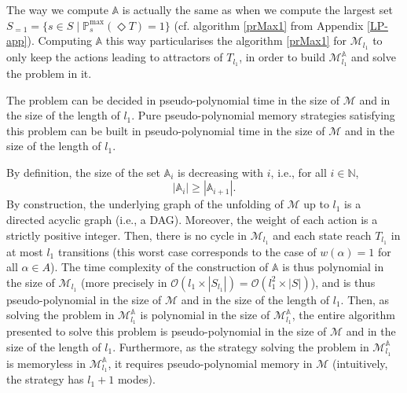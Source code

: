 The way we compute $\mathbb{A}$ is actually the same
as when we compute the largest set $S_{=1} = \{ s \in S \; | \; \mathbb{P}^{\max}_s(\Diamond T) = 1 \}$ (cf. algorithm \ref{prMax1} from Appendix \ref{LP-app}).
Computing $\mathbb{A}$ this way particularises the algorithm \ref{prMax1} for $\mathcal{M}_{l_1}$ to only keep the actions leading to attractors of $T_{l_1}$, in order to build $\mathcal{M}^\mathbb{A}_{l_1}$ and solve the \SSPE{} problem in it.

\begin{theorem}
  The \SSPWE{} problem can be decided in pseudo-polynomial time in the size of $\mathcal{M}$ and in the size of the length of $l_1$.
  Pure pseudo-polynomial memory strategies satisfying this problem can be built in pseudo-polynomial time in the size of $\mathcal{M}$ and in the size of the length of $l_1$.
\end{theorem}

By definition, the size of the set $\mathbb{A}_i$ is decreasing with $i$, i.e., for all $i \in \mathbb{N}$,
\[
  | \mathbb{A}_i | \geq | \mathbb{A}_{i+1} |.
\]
By construction, the underlying graph of the unfolding of $\mathcal{M}$ up to $l_1$ is a directed acyclic graph (i.e., a DAG). Moreover, the weight of each action is a strictly positive integer. Then, there is no cycle in $\mathcal{M}_{l_1}$ and each state reach $T_{l_1}$ in at most $l_1$ transitions (this worst case corresponds to the case of $w(\alpha)=1$ for all $\alpha \in A$).
The time complexity of the construction of $\mathbb{A}$ is thus polynomial in the size of $\mathcal{M}_{l_1}$ (more precisely in $\mathcal{O}(l_1 \times |S_{l_1}|) = \mathcal{O}(l_1^2 \times |S|)$), and is thus pseudo-polynomial in the size of $\mathcal{M}$ and in the size of the length of $l_1$. Then, as solving the \SSPE{} problem in $\mathcal{M}^\mathbb{A}_{l_1}$ is polynomial in the size of $\mathcal{M}^\mathbb{A}_{l_1}$,
the entire algorithm presented to solve this problem is pseudo-polynomial in the size of $\mathcal{M}$ and in the size of the length of $l_1$.
Furthermore, as the strategy solving the \SSPE{} problem in $\mathcal{M}_{l_1}^\mathbb{A}$ is memoryless in $\mathcal{M}_{l_1}^\mathbb{A}$, it requires pseudo-polynomial memory in $\mathcal{M}$ (intuitively, the strategy has $l_1 + 1$ modes).

